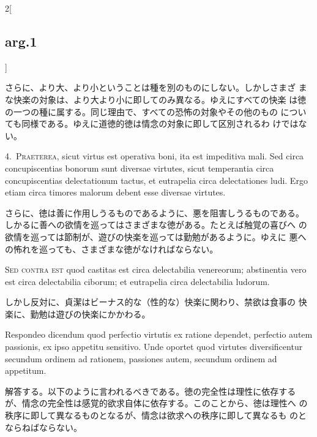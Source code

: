\documentclass[paper=a4paper,fontsize=10pt,jafontsize=9pt,titlepage]{jlreq}
\begin{document}
\begin{paracol}{2}[\subsection{arg.1}]
\switchcolumn

さらに、より大、より小ということは種を別のものにしない。しかしさまざ
 まな快楽の対象は、より大より小に即してのみ異なる。ゆえにすべての快楽
 は徳の一つの種に属する。同じ理由で、すべての恐怖の対象やその他のもの
 についても同様である。ゆえに道徳的徳は情念の対象に即して区別されるわ
 けではない。


4.~{\scshape Praeterea}, sicut virtus est operativa boni, ita est
impeditiva mali. Sed circa concupiscentias bonorum sunt diversae
virtutes, sicut temperantia circa concupiscentias delectationum
tactus, et eutrapelia circa delectationes ludi. Ergo etiam circa
timores malorum debent esse diversae virtutes.

\switchcolumn

さらに、徳は善に作用しうるものであるように、悪を阻害しうるものである。
 しかるに善への欲情を巡ってはさまざまな徳がある。たとえば触覚の喜びへ
 の欲情を巡っては節制が、遊びの快楽を巡っては勤勉があるように。ゆえに
 悪への怖れを巡っても、さまざまな徳がなければならない。

\switchcolumn*[\subsection{s.c.}]

{\scshape Sed contra est} quod castitas est circa delectabilia
venereorum; abstinentia vero est circa delectabilia ciborum; et
eutrapelia circa delectabilia ludorum.

\switchcolumn

しかし反対に、貞潔はビーナス的な（性的な）快楽に関わり、禁欲は食事の
 快楽に、勤勉は遊びの快楽にかかわる。


Respondeo dicendum quod perfectio virtutis ex ratione dependet,
 perfectio autem passionis, ex ipso appetitu sensitivo. Unde oportet
 quod virtutes diversificentur secundum ordinem ad rationem, passiones
 autem, secundum ordinem ad appetitum.

\switchcolumn

解答する。以下のように言われるべきである。徳の完全性は理性に依存する
 が、情念の完全性は感覚的欲求自体に依存する。このことから、徳は理性へ
 の秩序に即して異なるものとなるが、情念は欲求への秩序に即して異なるも
 のとならねばならない。


\end{paracol}
\end{document}
